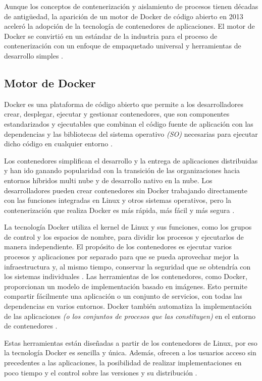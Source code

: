 \documentclass[12pt]{article}
\begin{document}
Aunque los conceptos de contenerización y aislamiento de procesos tienen 
décadas de antigüedad, la aparición de un motor de Docker de código abierto en 
2013 aceleró la adopción de la tecnología de contenedores de aplicaciones. 
El motor de Docker se convirtió en un estándar de la industria para el proceso 
de contenerización con un enfoque de empaquetado universal y herramientas de 
desarrollo simples \cite{Containerization}.

\subsection*{Motor de Docker}

Docker es una plataforma de código abierto que permite a los desarrolladores 
crear, desplegar, ejecutar y gestionar contenedores, que son componentes 
estandarizados y ejecutables que combinan el código fuente de aplicación con 
las dependencias y las bibliotecas del sistema operativo \emph{(SO)} necesarias para 
ejecutar dicho código en cualquier entorno \cite{docker}.

Los contenedores simplifican el desarrollo y la entrega de aplicaciones 
distribuidas y han ido ganando popularidad con la transición de las organizaciones 
hacia entornos híbridos multi nube y de desarrollo nativo en la nube.  
Los desarrolladores pueden crear contenedores sin Docker trabajando directamente 
con las funciones integradas en Linux y otros sistemas operativos, pero la 
contenerización que realiza Docker es más rápida, más fácil y más segura \cite{docker}.

La tecnología Docker utiliza el kernel de Linux y sus funciones, como los grupos 
de control y los espacios de nombre, para dividir los procesos y ejecutarlos de 
manera independiente. El propósito de los contenedores es ejecutar varios procesos 
y aplicaciones por separado para que se pueda aprovechar mejor la infraestructura y, 
al mismo tiempo, conservar la seguridad que se obtendría con los 
sistemas individuales \cite{Redhat}. Las herramientas de los contenedores, 
como Docker, proporcionan un modelo de implementación basado en imágenes. 
Esto permite compartir fácilmente una aplicación o un conjunto de servicios, 
con todas las dependencias en varios entornos. Docker también automatiza la 
implementación de las aplicaciones \emph{(o los conjuntos de procesos que las constituyen)} 
en el entorno de contenedores \cite{Redhat}.

Estas herramientas están diseñadas a partir de los contenedores de Linux, por 
eso la tecnología Docker es sencilla y única. Además, ofrecen a los usuarios 
acceso sin precedentes a las aplicaciones, la posibilidad de realizar 
implementaciones en poco tiempo y el control sobre las versiones y 
su distribución \cite{Redhat}.
\end{document}
